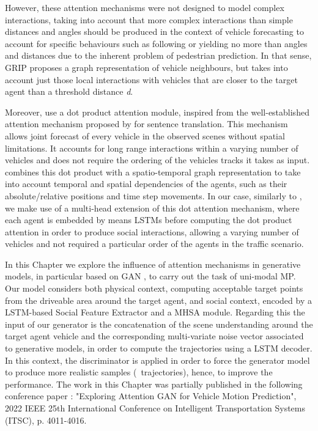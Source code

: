 However, these attention mechanisms were not designed to model complex interactions, taking into account that more complex interactions than simple distances and angles should be produced in the context of vehicle forecasting to account for specific behaviours such as following or yielding no more than angles and distances due to the inherent problem of pedestrian prediction. In that sense, GRIP \cite{li2019grip} proposes a graph representation of vehicle neighbours, but takes into account just those local interactions with vehicles that are closer to the target agent than a threshold distance \textit{d}. 

Moreover, \cite{vemula2018social} use a dot product attention module, inspired from the well-established attention mechanism proposed by \cite{vaswani2017attention} for sentence translation. This mechanism allows joint forecast of every vehicle in the observed scenes without spatial limitations. It accounts for long range interactions within a varying number of vehicles and does not require the ordering of the vehicles tracks it takes as input. \cite{vemula2018social} combines this dot product with a spatio-temporal graph representation to take into account temporal and spatial dependencies of the agents, such as their absolute/relative positions and time step movements. In our case, similarly to \cite{mercat2020multi}, we make use of a multi-head extension of this dot attention mechanism, where each agent is embedded by means \acp{LSTM} before computing the dot product attention in order to produce social interactions, allowing a varying number of vehicles and not required a particular order of the agents in the traffic scenario.

In this Chapter we explore the influence of attention mechanisms in generative models, in particular based on \ac{GAN} \cite{goodfellow2020generative}, to carry out the task of uni-modal \ac{MP}. Our model considers both physical context, computing acceptable target points from the driveable area around the target agent, and social context, encoded by a \ac{LSTM}-based Social Feature Extractor and a \acf{MHSA} module. Regarding this the input of our generator is the concatenation of the scene understanding around the target agent vehicle and the corresponding multi-variate noise vector associated to generative models, in order to compute the trajectories using a \ac{LSTM} decoder. In this context, the discriminator is applied in order to force the generator model to produce more realistic samples (\ie \ trajectories), hence, to improve the performance. The work in this Chapter was partially published in the following conference paper \cite{gomez2022exploring}: "Exploring Attention GAN for Vehicle Motion Prediction", 2022 IEEE 25th International Conference on Intelligent Transportation Systems (ITSC), p. 4011-4016. 


